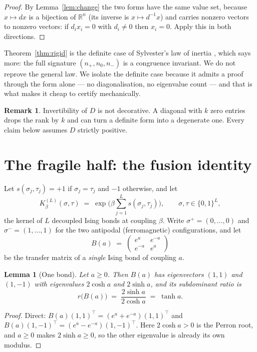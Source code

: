 \documentclass[11pt,a4paper]{article}
\theoremstyle{plain}
\newtheorem{lemma}[theorem]{Lemma}
\theoremstyle{definition}
\newtheorem{remark}[theorem]{Remark}
\newcommand{\R}{\mathbb{R}}
\begin{document}
\begin{proof}
By Lemma~\ref{lem:change} the two forms have the same value set, because
$x \mapsto dx$ is a bijection of $\R^n$ (its inverse is $x \mapsto d^{-1}x$) and
carries nonzero vectors to nonzero vectors: if $d_ix_i=0$ with $d_i\neq0$ then
$x_i=0$. Apply this in both directions.
\end{proof}

Theorem~\ref{thm:rigid} is the definite case of Sylvester's law of inertia
\cite{sylvester1852}, which says more: the full signature $(n_+,n_0,n_-)$ is a
congruence invariant. We do not reprove the general law. We isolate the definite
case because it admits a proof through the form alone --- no diagonalisation, no
eigenvalue count --- and that is what makes it cheap to certify mechanically.

\begin{remark}
Invertibility of $D$ is not decorative. A diagonal with $k$ zero entries drops
the rank by $k$ and can turn a definite form into a degenerate one. Every claim
below assumes $D$ strictly positive.
\end{remark}

\section{The fragile half: the fusion identity}

Let $s(\sigma_j,\tau_j)=+1$ if $\sigma_j=\tau_j$ and $-1$ otherwise, and let
\[
  K_\beta^{(L)}(\sigma,\tau)
    \;=\; \exp\Big(\beta \sum_{j=1}^{L} s(\sigma_j,\tau_j)\Big),
  \qquad \sigma,\tau \in \{0,1\}^L ,
\]
the kernel of $L$ decoupled Ising bonds at coupling $\beta$. Write
$\sigma^+ = (0,\dots,0)$ and $\sigma^-=(1,\dots,1)$ for the two antipodal
(ferromagnetic) configurations, and let
\[
  B(a) \;=\; \begin{pmatrix} e^{a} & e^{-a} \\ e^{-a} & e^{a}\end{pmatrix}
\]
be the transfer matrix of a \emph{single} Ising bond of coupling $a$.

\begin{lemma}[One bond]\label{lem:bond}
Let $a\ge 0$. Then $B(a)$ has eigenvectors $(1,1)$ and $(1,-1)$ with eigenvalues
$2\cosh a$ and $2\sinh a$, and its subdominant ratio is
\[
  r\big(B(a)\big)\;=\;\frac{2\sinh a}{2\cosh a} \;=\; \tanh a .
\]
\end{lemma}

\begin{proof}
Direct: $B(a)(1,1)^{\!\top} = (e^a+e^{-a})(1,1)^{\!\top}$ and
$B(a)(1,-1)^{\!\top} = (e^a-e^{-a})(1,-1)^{\!\top}$. Here $2\cosh a>0$ is the
Perron root, and $a\ge 0$ makes $2\sinh a\ge 0$, so the other eigenvalue is
already its own modulus.
\end{proof}
\end{document}
